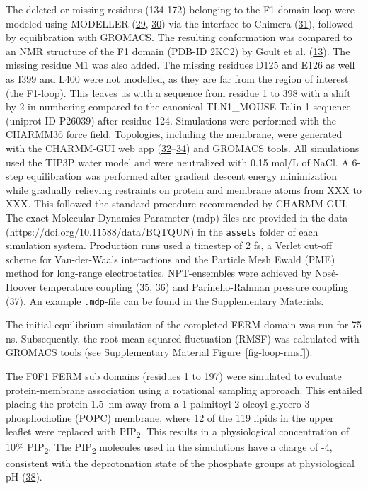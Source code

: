 \documentclass[
  twocolumn]{biophys-new-mod}
\begin{document}
The deleted or missing residues (134-172) belonging to the F1 domain
loop were modeled using MODELLER
(\protect\hyperlink{ref-marti-renomComparativeProteinStructure2000}{29},
\protect\hyperlink{ref-webbComparativeProteinStructure2016}{30}) via the
interface to Chimera
(\protect\hyperlink{ref-pettersenUCSFChimeraVisualization2004}{31}),
followed by equilibration with GROMACS. The resulting conformation was
compared to an NMR structure of the F1 domain (PDB-ID 2KC2) by Goult et
al. (\protect\hyperlink{ref-goultStructureDoubleUbiquitinlike2010}{13}).
The missing residue M1 was also added. The missing residues D125 and
E126 as well as I399 and L400 were not modelled, as they are far from
the region of interest (the F1-loop). This leaves us with a sequence from
residue 1 to 398 with a shift by 2 in numbering compared to the
canonical TLN1\_MOUSE Talin-1 sequence (uniprot ID P26039) after residue
124. Simulations were performed with the CHARMM36 force field.
Topologies, including the membrane, were generated with the CHARMM-GUI
web app
(\protect\hyperlink{ref-brooksCHARMMBiomolecularSimulation2009}{32}--\protect\hyperlink{ref-leeCHARMMGUIInputGenerator2016}{34})
and GROMACS tools. All simulations used the TIP3P water model and were
neutralized with 0.15 mol/L of NaCl. A 6-step equilibration was
performed after gradient descent energy minimization while gradually
relieving restraints on protein and membrane atoms from XXX to XXX. This followed the
standard procedure recommended by CHARMM-GUI. The exact Molecular
Dynamics Parameter (mdp) files are provided in the data
(https://doi.org/10.11588/data/BQTQUN) in the \texttt{assets} folder of
each simulation system. Production runs used a timestep of 2 fs, a
Verlet cut-off scheme for Van-der-Waals interactions and the Particle
Mesh Ewald (PME) method for long-range electrostatics. NPT-ensembles
were achieved by Nosé-Hoover temperature coupling
(\protect\hyperlink{ref-hooverCanonicalDynamicsEquilibrium1985}{35},
\protect\hyperlink{ref-noseUnifiedFormulationConstant1984}{36}) and
Parinello-Rahman pressure coupling
(\protect\hyperlink{ref-parrinelloPolymorphicTransitionsSingle1981}{37}).
An example \texttt{.mdp}-file can be found in the Supplementary
Materials.

The initial equilibrium simulation of the completed FERM domain was run
for 75 ns. Subsequently, the root mean squared fluctuation (RMSF) was
calculated with GROMACS tools (see Supplementary Material
Figure~\ref{fig-loop-rmsf}).

The F0F1 FERM sub domains (residues 1 to 197) were simulated to evaluate
protein-membrane association using a rotational sampling approach. This
entailed placing the protein 1.5~nm away from a
1-palmitoyl-2-oleoyl-glycero-3-phosphocholine (POPC) membrane, where 12
of the 119 lipids in the upper leaflet were replaced with
PIP\textsubscript{2}. This results in a physiological concentration of
10\% PIP\textsubscript{2}. The PIP\textsubscript{2} molecules used in
the simulutions have a charge of -4, consistent with the deprotonation
state of the phosphate groups at physiological pH
(\protect\hyperlink{ref-mclaughlinPIP2ProteinsInteractions2002}{38}).
\end{document}
